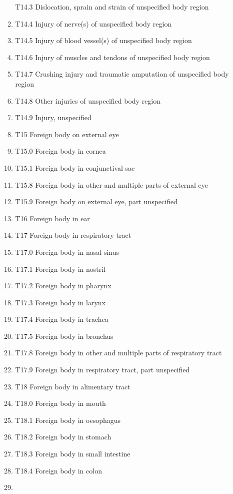 \documentclass[
]{scrartcl}
\begin{document}
\begin{itemize}
\begin{enumerate}
    T14.3 Dislocation, sprain and strain of unspecified body region
  \item
    T14.4 Injury of nerve(s) of unspecified body region
  \item
    T14.5 Injury of blood vessel(s) of unspecified body region
  \item
    T14.6 Injury of muscles and tendons of unspecified body region
  \item
    T14.7 Crushing injury and traumatic amputation of unspecified body
    region
  \item
    T14.8 Other injuries of unspecified body region
  \item
    T14.9 Injury, unspecified
  \item
    T15 Foreign body on external eye
  \item
    T15.0 Foreign body in cornea
  \item
    T15.1 Foreign body in conjunctival sac
  \item
    T15.8 Foreign body in other and multiple parts of external eye
  \item
    T15.9 Foreign body on external eye, part unspecified
  \item
    T16 Foreign body in ear
  \item
    T17 Foreign body in respiratory tract
  \item
    T17.0 Foreign body in nasal sinus
  \item
    T17.1 Foreign body in nostril
  \item
    T17.2 Foreign body in pharynx
  \item
    T17.3 Foreign body in larynx
  \item
    T17.4 Foreign body in trachea
  \item
    T17.5 Foreign body in bronchus
  \item
    T17.8 Foreign body in other and multiple parts of respiratory tract
  \item
    T17.9 Foreign body in respiratory tract, part unspecified
  \item
    T18 Foreign body in alimentary tract
  \item
    T18.0 Foreign body in mouth
  \item
    T18.1 Foreign body in oesophagus
  \item
    T18.2 Foreign body in stomach
  \item
    T18.3 Foreign body in small intestine
  \item
    T18.4 Foreign body in colon
  \item

\end{enumerate}
\end{itemize}
\end{document}
